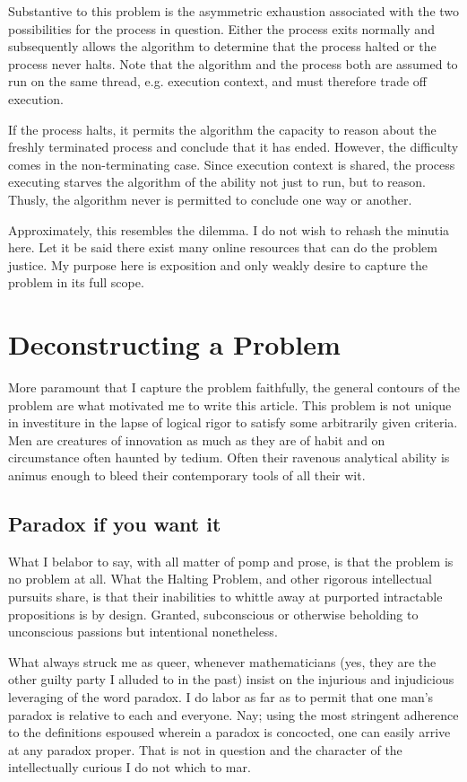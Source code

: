 \documentclass{article}
\begin{document}
	Substantive to this problem is the asymmetric exhaustion associated with the two possibilities for the process in question. Either the process exits normally and subsequently allows the algorithm to determine that the process halted or the process never halts. Note that the algorithm and the process both are assumed to run on the same thread, e.g. execution context, and must therefore trade off execution.
	
	If the process halts, it permits the algorithm the capacity to reason about the freshly terminated process and conclude that it has ended. However, the difficulty comes in the non-terminating case. Since execution context is shared, the process executing starves the algorithm of the ability not just to run, but to reason. Thusly, the algorithm never is permitted to conclude one way or another.
	
	Approximately, this resembles the dilemma. I do not wish to rehash the minutia here. Let it be said there exist many online resources that can do the problem justice. My purpose here is exposition and only weakly desire to capture the problem in its full scope.
	
	\section{Deconstructing a Problem}
	
	More paramount that I capture the problem faithfully, the general contours of the problem are what motivated me to write this article. This problem is not unique in investiture in the lapse of logical rigor to satisfy some arbitrarily given criteria. Men are creatures of innovation as much as they are of habit and on circumstance often haunted by tedium. Often their ravenous analytical ability is animus enough to bleed their contemporary tools of all their wit.
	
	\subsection{Paradox if you want it}
	What I belabor to say, with all matter of pomp and prose, is that the problem is no problem at all. What the Halting Problem, and other rigorous intellectual pursuits share, is that their inabilities to whittle away at purported intractable propositions is by design. Granted, subconscious or otherwise beholding to unconscious passions but intentional nonetheless.
	
	What always struck me as queer, whenever mathematicians (yes, they are the other guilty party I alluded to in the past) insist on the injurious and injudicious leveraging of the word paradox. I do labor as far as to permit that one man's paradox is relative to each and everyone. Nay; using the most stringent adherence to the definitions espoused wherein a paradox is concocted, one can easily arrive at any paradox proper. That is not in question and the character of the intellectually curious I do not which to mar.
	
\end{document}
